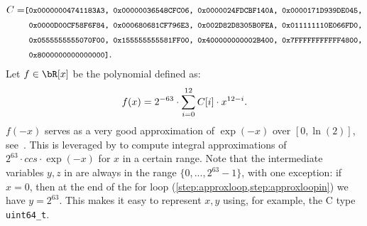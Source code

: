 \begin{align*}
C = & \footnotesize{\texttt{%
	[0x00000004741183A3, 0x00000036548CFC06, 0x0000024FDCBF140A, 0x0000171D939DE045,}} \\
	& \footnotesize{\texttt{%
	\ 0x0000D00CF58F6F84, 0x000680681CF796E3, 0x002D82D8305B0FEA, 0x011111110E066FD0,}}\\%
	& \footnotesize{\texttt{%
	\ 0x0555555555070F00, 0x155555555581FF00, 0x400000000002B400, 0x7FFFFFFFFFFF4800,}}\\%
	& \footnotesize{\texttt{%
	\ 0x8000000000000000]}}.%
\end{align*}
Let $f \in \bR[x]$ be the polynomial defined as:
$$f(x) = 2^{-63} \cdot \sum_{i=0}^{12} C[i] \cdot x^{12 - i}.$$
$f(-x)$ serves as a very good approximation of $\exp(-x)$ over $[0, \ln(2)]$, see~\cite{TC:ZhaSteSak20}. This is leveraged by \longapproxexp to compute integral approximations of $2^{63} \cdot ccs \cdot \exp(-x)$ for $x$ in a certain range. Note that the intermediate variables $y, z$ in \approxexp are always in the range $\{0, ..., 2^{63} - 1\}$, with one exception: if $x = 0$, then at the end of the for loop (\cref{step:approxloop,step:approxloopin}) we have $y = 2^{63}$. This makes it easy to represent $x,y$ using, for example, the C type \verb+uint64_t+.


\begin{algorithm}[!htb]
	\caption{$\approxexp(x, ccs)$}\label{alg:approxexp}
	\begin{algorithmic}[1]
		\label{step:approxloop}
		\label{step:approxloopin}
		\EndFor
	\end{algorithmic}
\end{algorithm}

